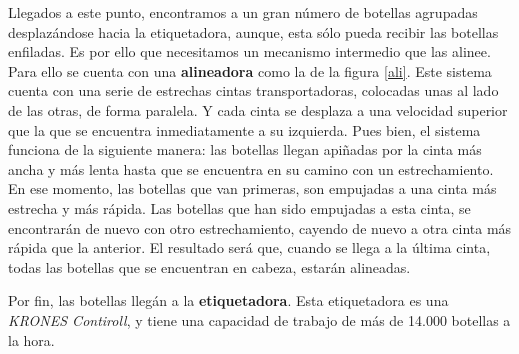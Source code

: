 \documentclass[11pt,a4paper,spanish,twoside]{report}
\begin{document}
Llegados a este punto, encontramos a un gran número de botellas agrupadas 
desplazándose hacia la etiquetadora, aunque, esta sólo pueda recibir las 
botellas enfiladas. Es por ello que necesitamos un mecanismo intermedio que 
las alinee. Para ello se cuenta con una \textbf{alineadora} como la de la
figura \ref{ali}. Este sistema cuenta con una serie de estrechas cintas
transportadoras, colocadas unas al lado de las otras, de forma paralela. Y
cada cinta se desplaza a una velocidad superior que la que se encuentra
inmediatamente a su izquierda. Pues bien, el sistema funciona de la siguiente
manera: las botellas llegan apiñadas por la cinta más ancha y más lenta hasta
que se encuentra en su camino con un estrechamiento. En ese momento, las
botellas que van primeras, son empujadas a una cinta más estrecha y más
rápida. Las botellas que han sido empujadas a esta cinta, se encontrarán de
nuevo con otro estrechamiento, cayendo de nuevo a otra cinta más rápida que
la anterior. El resultado será que, cuando se  llega a la última cinta, todas
las botellas que se encuentran en cabeza, estarán alineadas. 


Por fin, las botellas llegán a la \textbf{etiquetadora}. Esta etiquetadora es 
una \emph{KRONES Contiroll}, y tiene una capacidad de trabajo de más de 14.000 
botellas a la hora.
\end{document}
